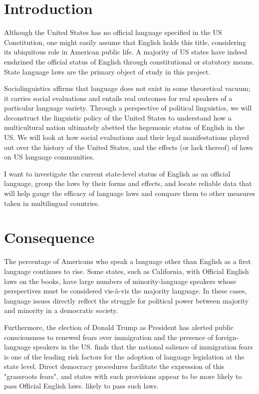 \documentclass{article}
\begin{document}
\section*{Introduction}

Although the United States has no official language specified in the US
Constitution, one might easily assume that English holds this title, considering
its ubiquitous role in American public life. A majority of US states have indeed
enshrined the official status of English through constitutional or statutory
means. State language laws are the primary object of study in this project.

Sociolinguistics affirms that language does not exist in some theoretical
vacuum; it carries social evaluations and entails real outcomes for real
speakers of a particular language variety. Through a perspective of political
linguistics, we will deconstruct the linguistic policy of the United States to
understand how a multicultural nation ultimately abetted the hegemonic status of
English in the US. We will look at how social evaluations and their legal
manifestations played out over the history of the United States, and the effects
(or lack thereof) of laws on US language communities.

I want to investigate the current state-level status of English as an official
language, group the laws by their forms and effects, and locate reliable data
that will help gauge the efficacy of language laws and compare them to other
measures taken in multilingual countries.

\section*{Consequence}

The percentage of Americans who speak a language other than English as a first
language continues to rise. Some states, such as California, with Official
English laws on the books, have large numbers of minority-language speakers
whose perspectives must be considered vis-à-vis the majority language. In these
cases, language issues directly reflect the struggle for political power between
majority and minority in a democratic society.

Furthermore, the election of Donald Trump as President has alerted public
consciousness to renewed fears over immigration and the presence of
foreign-language speakers in the US. \textcite{Liu14} finds that the national
salience of immigration fears is one of the leading risk factors for the
adoption of language legislation at the state level. Direct democracy procedures
facilitate the expression of this "grassroots fears", and states with such
provisions appear to be more likely to pass Official English laws.  likely to
pass such laws.
\end{document}
